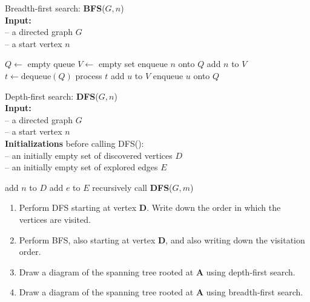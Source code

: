 \documentclass[a4paper]{article}
\begin{document}
\begin{algorithm}
  \caption{
    Breadth-first search: \textbf{BFS}($G,n$)\\
    \textbf{Input:}\\
    -- a directed graph $G$\\
    -- a start vertex $n$
  }\label{algo:bfs}
  \begin{algorithmic}
    \STATE $Q \leftarrow$ empty queue 
    \STATE $V \leftarrow$ empty set 
    \STATE enqueue $n$ onto $Q$
    \STATE add $n$ to $V$
      \STATE $t \leftarrow \text{dequeue}(Q)$
      \STATE process $t$ 
          \STATE add $u$ to $V$
          \STATE enqueue $u$ onto $Q$
        \ENDIF
      \ENDFOR
    \ENDWHILE
  \end{algorithmic}
\end{algorithm}

\begin{algorithm}
  \caption{
    Depth-first search: \textbf{DFS}($G,n$)\\
    \textbf{Input:}\\
    -- a directed graph $G$\\
    -- a start vertex $n$\\
    \textbf{Initializations} before calling DFS():\\
    -- an initially empty set of discovered vertices $D$\\
    -- an initially empty set of explored edges $E$
  }\label{algo:dfs}
  \begin{algorithmic}
    \STATE add $n$ to $D$ 
        \STATE add $e$ to $E$ 
          \STATE recursively call \textbf{DFS}($G,m$)
        \ENDIF
      \ENDIF
    \ENDFOR
  \end{algorithmic}
\end{algorithm}

\begin{enumerate}
\item
  Perform DFS starting at vertex \textbf{D}.
  Write down the order in which the vertices are visited.
\item
  Perform BFS, also starting at vertex \textbf{D}, and also writing down the visitation order.
\item
  Draw a diagram of the spanning tree rooted at \textbf{A} using depth-first search.
\item
  Draw a diagram of the spanning tree rooted at \textbf{A} using breadth-first search.
\end{enumerate}
\end{document}

